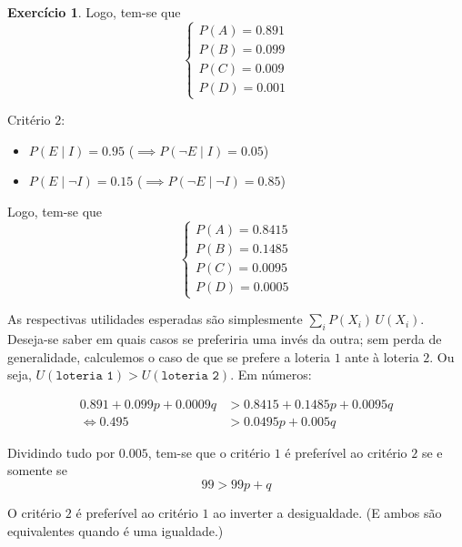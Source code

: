 \documentclass[12pt]{article}
\numberwithin{equation}{section}
\theoremstyle{plain}
\theoremstyle{definition}
\newtheorem{exercise}{Exercício}
\theoremstyle{remark}
\begin{document}
\begin{exercise}
  Logo, tem-se que
  \[
\begin{cases}
  P(A) = 0.891 \\
  P(B) = 0.099 \\
  P(C) = 0.009 \\
  P(D) = 0.001
  \end{cases}
  \]
  
  Critério \(2\): 
  \begin{itemize}
    \item \(P(E \mid I) = 0.95\) (\(\implies P(\lnot E \mid I) = 0.05\))
    \item \(P(E \mid \lnot I) = 0.15\) (\(\implies P(\lnot E \mid \lnot I) = 0.85\))  
  \end{itemize}
  
  Logo, tem-se que
\[
\begin{cases}
  P(A) = 0.8415 \\
  P(B) = 0.1485 \\
  P(C) = 0.0095 \\
P(D) = 0.0005
\end{cases}
\]

As respectivas utilidades esperadas são simplesmente \(\sum \limits_{i} P(X_{i}) \, U(X_{i})\). Deseja-se saber em quais casos se preferiria uma invés da outra; sem perda de generalidade, calculemos o caso de que se prefere a loteria \(1\) ante à loteria \(2\). Ou seja, \(U(\texttt{loteria 1}) > U(\texttt{loteria 2})\). Em números:

\begin{align}
0.891 + 0.099 p + 0.0009 q &> 0.8415 + 0.1485p + 0.0095 q \\
\iff 0.495 &> 0.0495p + 0.005q
\end{align}

Dividindo tudo por \(0.005\), tem-se que o critério \(1\) é preferível ao critério \(2\) se e somente se
\[
  99 > 99p + q
  \]
  
  O critério \(2\) é preferível ao critério \(1\) ao inverter a desigualdade. (E ambos são equivalentes quando é uma igualdade.)

\end{exercise}


\end{document}
